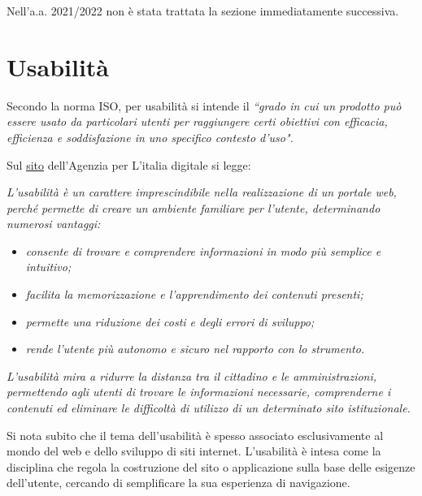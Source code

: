 Nell'a.a. 2021/2022 non è stata trattata la sezione immediatamente successiva.


\section{Usabilità}

Secondo la norma ISO, per usabilità si intende il \textit{``grado in cui un prodotto può essere usato da particolari utenti per raggiungere
certi obiettivi con efficacia, efficienza e soddisfazione in uno specifico contesto d’uso".} 

Sul \href{https://www.agid.gov.it/it/design-servizi/usabilita}{\underline{sito}} dell'Agenzia per L'italia digitale si legge:

\vspace{\baselineskip}
\textit{L'usabilità è un carattere imprescindibile nella realizzazione di un portale web, perché permette di creare un ambiente familiare per
l'utente, determinando numerosi vantaggi:}
\begin{itemize}
	\itemsep-0.3em
    \item \textit{consente di trovare e comprendere informazioni in modo più semplice e intuitivo;}
    \item \textit{facilita la memorizzazione e l'apprendimento dei contenuti presenti;}
    \item \textit{permette una riduzione dei costi e degli errori di sviluppo;}
    \item \textit{rende l'utente più autonomo e sicuro nel rapporto con lo strumento.}
\end{itemize}

\textit{L'usabilità mira a ridurre la distanza tra il cittadino e le amministrazioni, permettendo agli utenti di trovare le informazioni necessarie,
comprenderne i contenuti ed eliminare le difficoltà di utilizzo di un determinato sito istituzionale.}
\vspace{\baselineskip}

Si nota subito che il tema dell'usabilità è spesso associato esclusivamente al mondo del web e dello sviluppo di siti internet. L'usabilità è
intesa come la disciplina che regola la costruzione del sito o applicazione sulla base delle esigenze dell’utente, cercando di semplificare la sua
esperienza di navigazione.

